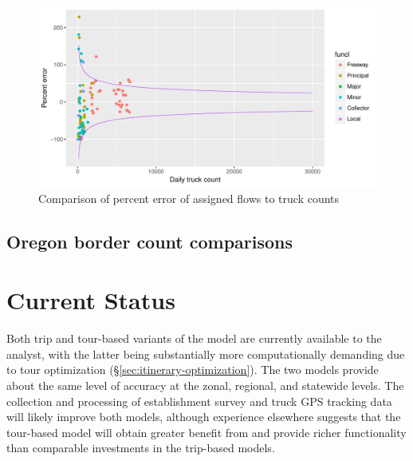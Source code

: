 \begin{figure}
\centering
\includegraphics[width=6.5in]{ct/ct-validation-redux2.pdf}
\caption{Comparison of percent error of assigned flows to truck counts}
\label{fig:ct-mde-comparison}
\end{figure}

\subsection{Oregon border count comparisons}


\section{Current Status}
Both trip and tour-based variants of the model are currently available to the analyst, with the latter being substantially more computationally demanding due to tour optimization (\S\ref{sec:itinerary-optimization}). The two models provide about the same level of accuracy at the zonal, regional, and statewide levels. The collection and processing of establishment survey and truck GPS tracking data will likely improve both models, although experience elsewhere suggests that the tour-based model will obtain greater benefit from and provide richer functionality than comparable investments in the trip-based models. 
